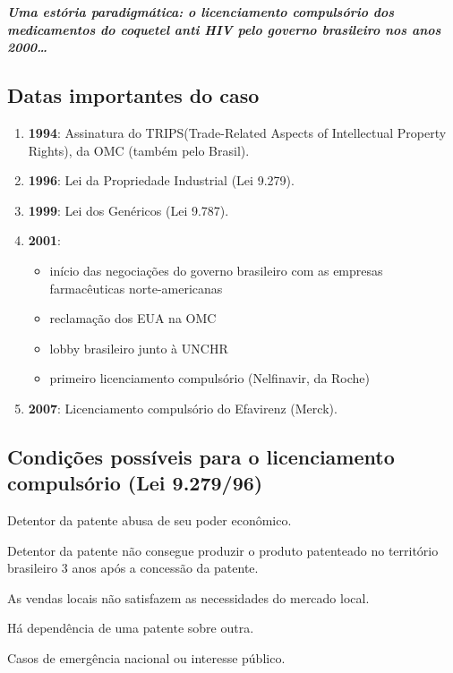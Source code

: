 \documentclass[a4paper,12pt]{article}[abntex2]
\begin{document}
\textbf{\textit{Uma estória paradigmática: o licenciamento compulsório dos medicamentos do coquetel anti HIV pelo governo brasileiro nos anos 2000…}}

\subsection{\textbf{Datas importantes do caso}}
\begin{enumerate}
    \item \textbf{1994}: Assinatura do TRIPS(Trade-Related Aspects of Intellectual Property Rights), da OMC (também pelo Brasil).
    \item \textbf{1996}: Lei da Propriedade Industrial (Lei 9.279).
    \item \textbf{1999}: Lei dos Genéricos (Lei 9.787).
    \item \textbf{2001}: \begin{itemize}
        \item início das negociações do governo brasileiro com as empresas farmacêuticas norte-americanas
        \item reclamação dos EUA na OMC
        \item lobby brasileiro junto à UNCHR
        \item primeiro licenciamento compulsório (Nelfinavir, da Roche)
    \end{itemize}
    \item \textbf{2007}: Licenciamento compulsório do Efavirenz (Merck).
\end{enumerate}

\subsection{\textbf{Condições possíveis para o licenciamento compulsório (Lei 9.279/96)}}
Detentor da patente abusa de seu poder econômico.

Detentor da patente não consegue produzir o produto patenteado no território brasileiro 3 anos após a concessão da patente.

As vendas locais não satisfazem as necessidades do mercado local.

Há dependência de uma patente sobre outra. 

Casos de emergência nacional ou interesse público.
\end{document}
